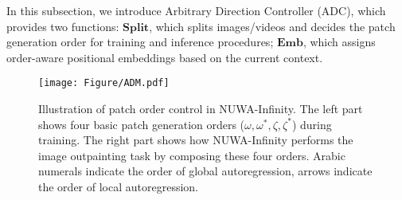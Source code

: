 \documentclass{article}
\begin{document}
In this subsection, we introduce Arbitrary Direction Controller (ADC), which provides two functions: $\textbf{Split}$, which splits images/videos and decides the patch generation order for training and inference procedures; $\textbf{Emb}$, which assigns order-aware positional embeddings based on the current context.

\begin{figure}[t!]
    \centering
    \texttt{[image: Figure/ADM.pdf]}
    \caption{Illustration of patch order control in NUWA-Infinity. The left part shows four basic patch generation orders ($\omega, \omega^*,\zeta, \zeta^*$) during training. The right part shows how NUWA-Infinity performs the image outpainting task by composing these four orders. Arabic numerals indicate the order of global autoregression, arrows indicate the order of local autoregression.}
    \label{fig:adc}
    \vspace{-3mm}
\end{figure}
\end{document}
